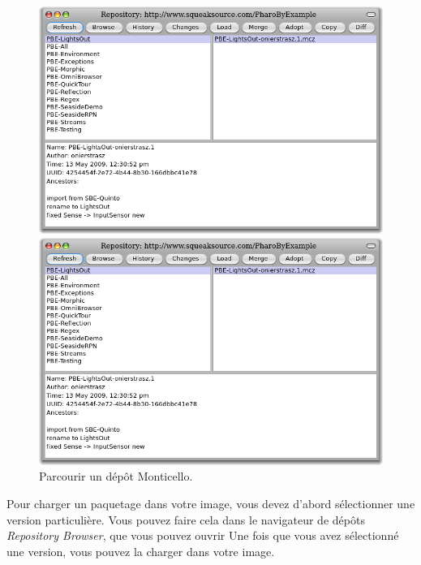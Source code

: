 \documentclass[a4paper,10pt,twoside]{book}
\begin{document}
\begin{figure}[hbt]
\ifluluelse
	{\centerline {\includegraphics[width=\textwidth]{BrowseRepository}}}
	{\centerline {\includegraphics[scale=0.7]{BrowseRepository}}}
\caption{Parcourir un dépôt Monticello.
}
\end{figure}


Pour charger un paquetage dans votre image, vous devez d'abord
sélectionner une version particulière. Vous pouvez faire cela dans le
navigateur de dépôts \emph{Repository Browser}, que vous pouvez ouvrir
Une fois que vous avez sélectionné une version, vous pouvez la
charger dans votre image.
\end{document}

